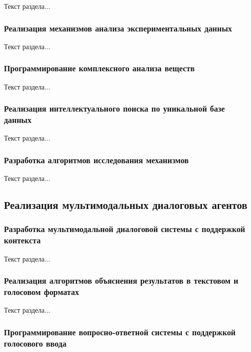 Текст раздела...

\subsubsection{Реализация механизмов анализа экспериментальных данных}

Текст раздела...

\subsubsection{Программирование комплексного анализа веществ}

Текст раздела...

\subsubsection{Реализация интеллектуального поиска по уникальной базе данных}

Текст раздела...

\subsubsection{Разработка алгоритмов исследования механизмов}

Текст раздела...

\subsection{Реализация мультимодальных диалоговых агентов}

\subsubsection{Разработка мультимодальной диалоговой системы с поддержкой контекста}

Текст раздела...

\subsubsection{Реализация алгоритмов объяснения результатов в текстовом и голосовом форматах}

Текст раздела...

\subsubsection{Программирование вопросно-ответной системы с поддержкой голосового ввода}

